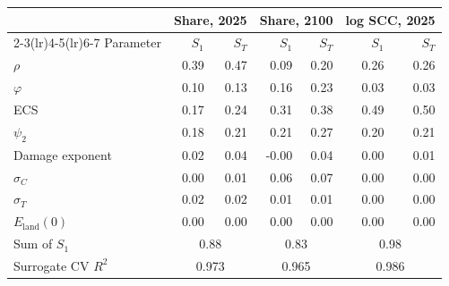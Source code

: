 \begin{tabular}{lrrrrrr}
\toprule
 & \multicolumn{2}{c}{Share, 2025} & \multicolumn{2}{c}{Share, 2100} & \multicolumn{2}{c}{log SCC, 2025} \\
\cmidrule(lr){2-3}\cmidrule(lr){4-5}\cmidrule(lr){6-7}
Parameter & $S_1$ & $S_T$ & $S_1$ & $S_T$ & $S_1$ & $S_T$ \\
\midrule
$\rho$ & 0.39 & 0.47 & 0.09 & 0.20 & 0.26 & 0.26 \\
$\varphi$ & 0.10 & 0.13 & 0.16 & 0.23 & 0.03 & 0.03 \\
ECS & 0.17 & 0.24 & 0.31 & 0.38 & 0.49 & 0.50 \\
$\psi_2$ & 0.18 & 0.21 & 0.21 & 0.27 & 0.20 & 0.21 \\
Damage exponent & 0.02 & 0.04 & -0.00 & 0.04 & 0.00 & 0.01 \\
$\sigma_C$ & 0.00 & 0.01 & 0.06 & 0.07 & 0.00 & 0.00 \\
$\sigma_T$ & 0.02 & 0.02 & 0.01 & 0.01 & 0.00 & 0.00 \\
$E_{\mathrm{land}}(0)$ & 0.00 & 0.00 & 0.00 & 0.00 & 0.00 & 0.00 \\
\midrule
Sum of $S_1$ & \multicolumn{2}{c}{0.88} & \multicolumn{2}{c}{0.83} & \multicolumn{2}{c}{0.98} \\
Surrogate CV $R^2$ & \multicolumn{2}{c}{0.973} & \multicolumn{2}{c}{0.965} & \multicolumn{2}{c}{0.986} \\
\bottomrule
\end{tabular}
